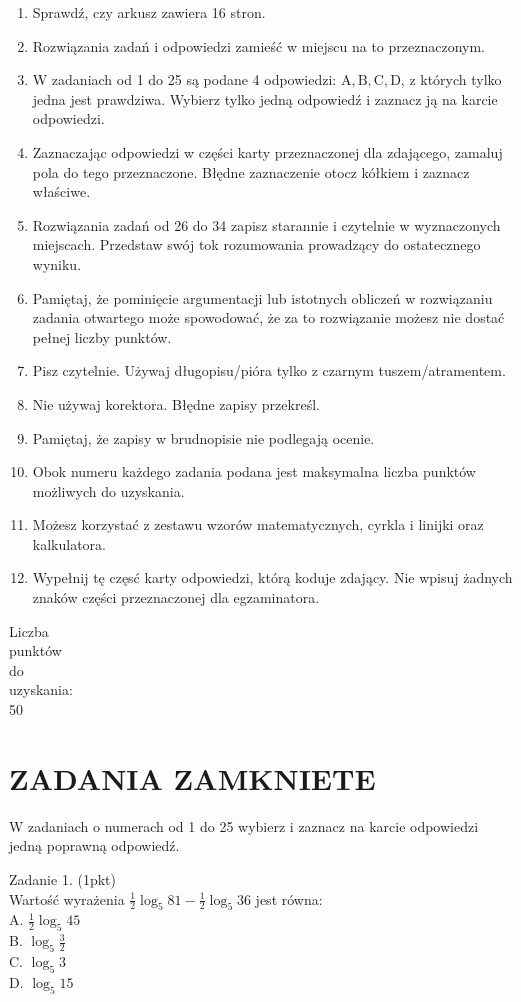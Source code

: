 \documentclass[10pt]{article}
\begin{document}
\begin{enumerate}
  \item Sprawdź, czy arkusz zawiera 16 stron.
  \item Rozwiązania zadań i odpowiedzi zamieść w miejscu na to przeznaczonym.
  \item W zadaniach od 1 do 25 są podane 4 odpowiedzi: \(\mathrm{A}, \mathrm{B}, \mathrm{C}, \mathrm{D}\), z których tylko jedna jest prawdziwa. Wybierz tylko jedną odpowiedź i zaznacz ją na karcie odpowiedzi.
  \item Zaznaczając odpowiedzi w części karty przeznaczonej dla zdającego, zamaluj pola do tego przeznaczone. Błędne zaznaczenie otocz kółkiem i zaznacz właściwe.
  \item Rozwiązania zadań od 26 do 34 zapisz starannie i czytelnie w wyznaczonych miejscach. Przedstaw swój tok rozumowania prowadzący do ostatecznego wyniku.
  \item Pamiętaj, że pominięcie argumentacji lub istotnych obliczeń w rozwiązaniu zadania otwartego może spowodować, że za to rozwiązanie możesz nie dostać pełnej liczby punktów.
  \item Pisz czytelnie. Używaj długopisu/pióra tylko z czarnym tuszem/atramentem.
  \item Nie używaj korektora. Błędne zapisy przekreśl.
  \item Pamiętaj, że zapisy w brudnopisie nie podlegają ocenie.
  \item Obok numeru każdego zadania podana jest maksymalna liczba punktów możliwych do uzyskania.
  \item Możesz korzystać z zestawu wzorów matematycznych, cyrkla i linijki oraz kalkulatora.
  \item Wypełnij tę częsć karty odpowiedzi, którą koduje zdający. Nie wpisuj żadnych znaków części przeznaczonej dla egzaminatora.
\end{enumerate}

Liczba\\
punktów\\
do\\
uzyskania:\\
50

\section*{ZADANIA ZAMKNIETE}
W zadaniach o numerach od 1 do 25 wybierz i zaznacz na karcie odpowiedzi jedną poprawną odpowiedź.

Zadanie 1. (1pkt)\\
Wartość wyrażenia \(\frac{1}{2} \log _{5} 81-\frac{1}{2} \log _{5} 36\) jest równa:\\
A. \(\frac{1}{2} \log _{5} 45\)\\
B. \(\log _{5} \frac{3}{2}\)\\
C. \(\log _{5} 3\)\\
D. \(\log _{5} 15\)
\end{document}
